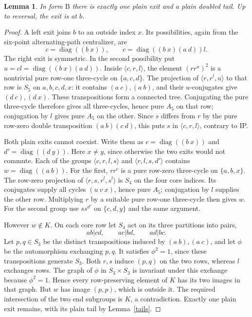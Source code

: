 \documentclass[11pt,a4paper]{article}
\newtheorem{lemma}{Lemma}
\newcommand{\gen}[1]{\langle#1\rangle}
\newcommand{\diag}{\operatorname{diag}}
\begin{document}
\begin{lemma}\label{Bexit}
In form $\mathrm B$ there is exactly one plain exit and a
plain doubled tail. Up to reversal, the exit is at $b$.
\end{lemma}
\begin{proof}
A left exit joins $b$ to an outside index $x$. Its possibilities,
again from the six-point alternating-path centralizer, are
\[
               c=\diag((b\ x)),\qquad
               c=\diag((b\ x)(a\ d))l.
\]
The right exit is symmetric. In the second possibility put
$u=cl=\diag((b\ x)(a\ d))$. Inside $\gen{c,r,l}$,
the element $(rr^u)^2$ is a nontrivial pure row-one three-cycle
on $\{a,c,d\}$. The projection of $\gen{r,r^l,u}$ to that
row is $S_5$ on $a,b,c,d,x$: it contains $(a\ c),(a\ b)$,
and their $u$-conjugates give $(d\ c),(d\ x)$. These
transpositions form a connected tree. Conjugating the pure
three-cycle therefore gives all three-cycles, hence pure $A_5$
on that row; conjugation by $l$ gives pure $A_5$ on the other.
Since $s$ differs from $r$ by the pure row-zero double
transposition $(a\ b)(c\ d)$, this puts $s$ in
$\gen{c,r,l}$, contrary to IP.

Both plain exits cannot coexist. Write them as
$c=\diag((b\ x))$ and $d'=\diag((d\ y))$. Here $x\ne y$,
since otherwise the two exits would not commute. Each of the
groups $\gen{c,r,l,s}$ and $\gen{r,l,s,d'}$ contains
$w=\diag((a\ b))$. For the first, $rr^c$ is a pure row-zero
three-cycle on $\{a,b,x\}$. The row-zero projection of
$\gen{r,s,r^l,s^l}$ is $S_4$ on the four core indices. Its
conjugates supply all cycles $(u\ v\ x)$, hence pure $A_5$;
conjugation by $l$ supplies the other row. Multiplying $r$ by
a suitable pure row-one three-cycle then gives $w$. For the
second group use $ss^{d'}$ on $\{c,d,y\}$ and the same argument.

However $w\notin K$. On each core row let $S_4$ act on its
three partitions into pairs,
\[
                  ab|cd,\qquad ac|bd,\qquad ad|bc.
\]
Let $p,q\in S_3$ be the distinct transpositions induced by
$(a\ b),(a\ c)$, and let $\phi$ be the automorphism exchanging
$p,q$. It satisfies $\phi^2=1$, since these transpositions
generate $S_3$. Both $r,s$ induce $(p,q)$ on the two rows,
whereas $l$ exchanges rows. The graph of $\phi$ in
$S_3\times S_3$ is invariant under this exchange because
$\phi^2=1$. Hence every row-preserving element of $K$ has
its two images in that graph. But $w$ has image $(p,p)$,
which is outside it. The required intersection of the two
end subgroups is $K$, a contradiction. Exactly one plain exit
remains, with its plain tail by Lemma~\ref{tails}.
\end{proof}
\end{document}
